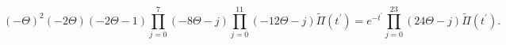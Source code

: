\begin{equation}
\label{eq:PF}
(-\Theta)^2(-2\Theta)(-2\Theta-1)\prod_{j=0}^7(-8\Theta - j)\prod_{j=0}^{11}(-12\Theta - j)
\tilde{\Pi}(t^\prime)
=e^{-t^\prime}\prod_{j=0}^{23}(24\Theta - j)\tilde{\Pi}(t^\prime).
\end{equation}

